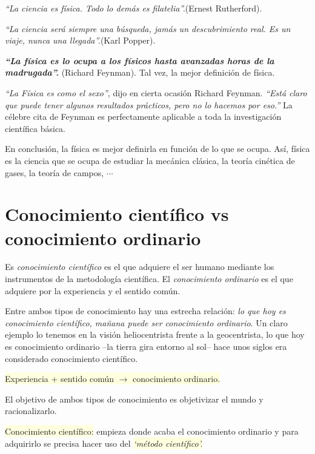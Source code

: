 \begin{changemargin}{1cm}{1cm}
\textit{``La ciencia es física. Todo lo demás es filatelia''.}\small{(Ernest Rutherford)}\normalsize{.}

\textit{``La ciencia será siempre una búsqueda, jamás un descubrimiento real. Es un viaje, nunca una llegada''.}\small{(Karl Popper)}\normalsize{.}

\textbf{\textit{``La física es lo ocupa a los físicos hasta avanzadas horas de la madrugada''.}} \small{(Richard Feynman)}\normalsize{.} Tal vez, la mejor definición de física.

\end{changemargin}

\textit{``La Física es como el sexo''}, dijo en cierta ocasión Richard Feynman.  \textit{``Está claro que puede tener algunos resultados prácticos, pero no lo hacemos por eso.''} La célebre cita de Feynman es perfectamente aplicable a toda la investigación científica básica.	
	

En conclusión, la física es mejor definirla en función de lo que se ocupa. Así, física es la ciencia que se ocupa de estudiar la mecánica clásica, la teoría cinética de gases, la teoría de campos, $\cdots$

\section{Conocimiento científico vs conocimiento ordinario}


Es \emph{conocimiento científico} es el que  adquiere el ser humano mediante los instrumentos de la metodología científica. El \emph{conocimiento ordinario} es el que adquiere por la experiencia y el sentido común.

Entre ambos tipos de conocimiento hay una estrecha relación: \emph{lo que hoy es conocimiento científico, mañana puede ser conocimiento ordinario}. Un claro ejemplo lo tenemos en la visión heliocentrista frente a la geocentrista, lo que hoy es conocimiento ordinario --la tierra gira entorno al sol-- hace unos siglos era considerado conocimiento científico.

\vspace{2mm}\centerline{\colorbox{LightYellow}{Experiencia + sentido común $\to$ conocimiento ordinario.}}\justify

 El objetivo de ambos tipos de conocimiento es objetivizar el mundo y racionalizarlo. 

\colorbox{LightYellow}{Conocimiento científico:} empieza donde acaba el conocimiento ordinario y para adquirirlo se precisa hacer uso del \colorbox{LightYellow}{\textit{`método científico'.}}

